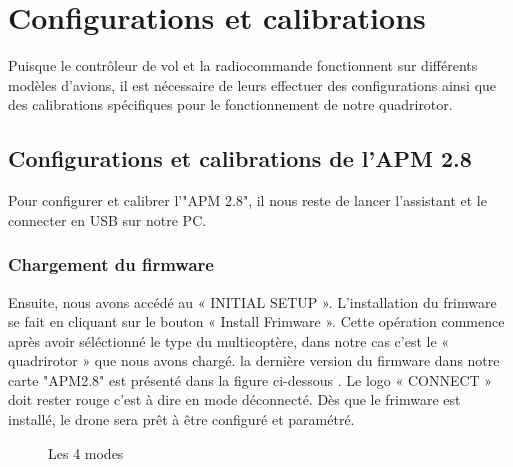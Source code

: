 	
	\section{Configurations et calibrations}
	Puisque le contrôleur de vol et la radiocommande fonctionnent sur différents modèles d'avions, il est nécessaire de leurs effectuer des configurations  ainsi que  des calibrations spécifiques pour le fonctionnement de notre quadrirotor. 
	\subsection{Configurations et calibrations de l'APM 2.8}
	Pour configurer et calibrer l'"APM 2.8", il nous reste  de lancer l’assistant et le connecter en USB sur notre PC.
	\subsubsection{Chargement du firmware }
	Ensuite, nous avons accédé au « INITIAL SETUP ». L'installation du frimware se fait en cliquant sur le bouton « Install Frimware ». Cette opération commence après avoir séléctionné le type du multicoptère, dans notre cas c'est le « quadrirotor » que nous avons chargé.  la dernière version du firmware dans
	notre carte "APM2.8" est présenté dans la figure ci-dessous . Le logo « CONNECT » doit rester rouge c'est à dire en mode déconnecté. Dès que le frimware est installé, le drone sera prêt à être configuré et paramétré.
	\begin{figure}[h]
		\begin{center}
			\centering
		\end{center}
		\caption{Les 4 modes}
	\end{figure}
	
